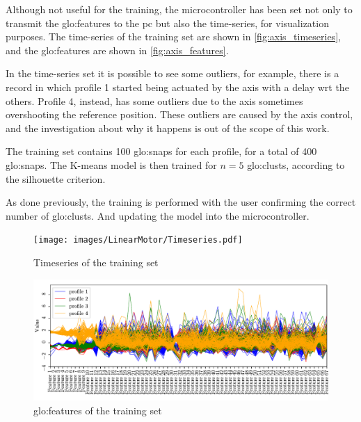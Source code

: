 Although not useful for the training, the microcontroller has been set not only to transmit the \gls{glo:feature}s to the \gls{pc} but also the time-series, for visualization purposes. The time-series of the training set are shown in \autoref{fig:axis_timeseries}, and the \gls{glo:feature}s are shown in \autoref{fig:axis_features}.

In the time-series set it is possible to see some outliers, for example, there is a record in which profile 1 started being actuated by the axis with a delay \gls{wrt} the others. Profile 4, instead, has some outliers due to the axis sometimes overshooting the reference position. These outliers are caused by the axis control, and the investigation about why it happens is out of the scope of this work. 

The training set contains 100 \gls{glo:snap}s for each profile, for a total of 400 \gls{glo:snap}s. The K-means model is then trained for $n=5$ \gls{glo:clust}s, according to the silhouette criterion.

As done previously, the training is performed with the user confirming the correct number of \gls{glo:clust}s. And updating the model into the microcontroller.

\begin{figure}
    \centering
    \texttt{[image: images/LinearMotor/Timeseries.pdf]}
    \caption{Timeseries of the training set}
    \label{fig:axis_timeseries}
\end{figure}


\begin{figure}
    \centering
    \includegraphics[width=\textwidth]{images/LinearMotor/Features.pdf}
    \caption{\gls{glo:feature}s of the training set}
    \label{fig:axis_features}
\end{figure}

